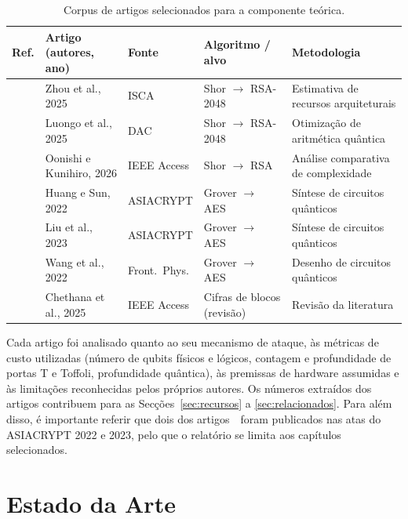 \documentclass[11pt,a4paper]{article}
\begin{document}
\begin{table}[htbp]
\centering
\caption{Corpus de artigos selecionados para a componente teórica.}
\label{tab:corpus}
\footnotesize
\begin{tabularx}{\textwidth}{c Y Y Y Y}
\toprule
\textbf{Ref.} & \textbf{Artigo (autores, ano)} & \textbf{Fonte} & \textbf{Algoritmo / alvo} & \textbf{Metodologia} \\
\midrule
\cite{zhou2025} & Zhou et al., 2025 & ISCA & Shor $\rightarrow$ RSA-2048 & Estimativa de recursos arquiteturais \\
\cite{luongo2025} & Luongo et al., 2025 & DAC & Shor $\rightarrow$ RSA-2048 & Otimização de aritmética quântica \\
\cite{oonishi2026} & Oonishi e Kunihiro, 2026 & IEEE Access & Shor $\rightarrow$ RSA & Análise comparativa de complexidade \\
\cite{huang2022} & Huang e Sun, 2022 & ASIACRYPT & Grover $\rightarrow$ AES & Síntese de circuitos quânticos \\
\cite{liu2023} & Liu et al., 2023 & ASIACRYPT & Grover $\rightarrow$ AES & Síntese de circuitos quânticos \\
\cite{wang2022} & Wang et al., 2022 & Front.\ Phys. & Grover $\rightarrow$ AES & Desenho de circuitos quânticos \\
\cite{chethana2025} & Chethana et al., 2025 & IEEE Access & Cifras de blocos (revisão) & Revisão da literatura \\
\bottomrule
\end{tabularx}
\end{table}

Cada artigo foi analisado quanto ao seu mecanismo de ataque, às métricas de custo utilizadas (número de qubits físicos e lógicos, contagem e profundidade de portas T e Toffoli, profundidade quântica), às premissas de hardware assumidas e às limitações reconhecidas pelos próprios autores. Os números extraídos dos artigos contribuem para as Secções~\ref{sec:recursos} a \ref{sec:relacionados}. Para além disso, é importante referir que dois dos artigos~\cite{huang2022, liu2023}~foram publicados nas atas do ASIACRYPT 2022 e 2023, pelo que o relatório se limita aos capítulos selecionados.

\clearpage

\section{Estado da Arte}\label{sec:estadoarte}
\end{document}
